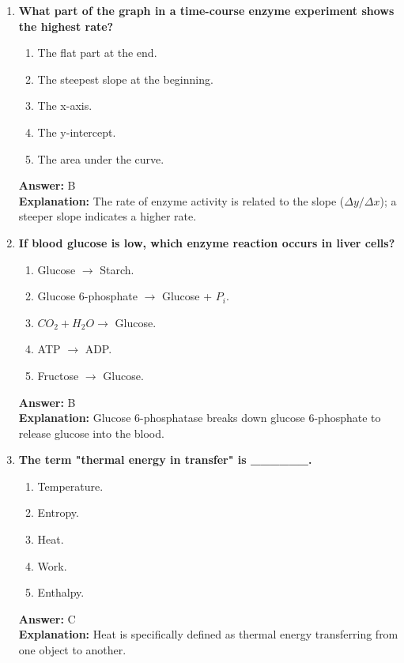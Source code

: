 \documentclass[11pt, a4paper]{article}
\begin{document}
\begin{enumerate}[leftmargin=*, label=\arabic*.]
\item \textbf{What part of the graph in a time-course enzyme experiment shows the highest rate?}
\begin{enumerate}[label=\Alph*.]
    \item The flat part at the end.
    \item The steepest slope at the beginning.
    \item The x-axis.
    \item The y-intercept.
    \item The area under the curve.
\end{enumerate}
\textbf{Answer:} B \\
\textbf{Explanation:} The rate of enzyme activity is related to the slope ($\Delta y / \Delta x$); a steeper slope indicates a higher rate.

\item \textbf{If blood glucose is low, which enzyme reaction occurs in liver cells?}
\begin{enumerate}[label=\Alph*.]
    \item Glucose $\rightarrow$ Starch.
    \item Glucose 6-phosphate $\rightarrow$ Glucose + $P_i$.
    \item $CO_2 + H_2O \rightarrow$ Glucose.
    \item ATP $\rightarrow$ ADP.
    \item Fructose $\rightarrow$ Glucose.
\end{enumerate}
\textbf{Answer:} B \\
\textbf{Explanation:} Glucose 6-phosphatase breaks down glucose 6-phosphate to release glucose into the blood.

\item \textbf{The term "thermal energy in transfer" is \_\_\_\_\_\_.}
\begin{enumerate}[label=\Alph*.]
    \item Temperature.
    \item Entropy.
    \item Heat.
    \item Work.
    \item Enthalpy.
\end{enumerate}
\textbf{Answer:} C \\
\textbf{Explanation:} Heat is specifically defined as thermal energy transferring from one object to another.


\end{enumerate}
\end{document}

